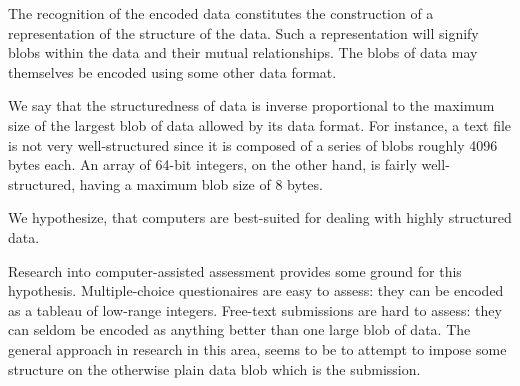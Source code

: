 The recognition of the encoded data constitutes the construction of a
representation of the structure of the data. Such a representation will signify
blobs within the data and their mutual relationships. The blobs of data may
themselves be encoded using some other data format.

We say that the structuredness of data is inverse proportional to the maximum
size of the largest blob of data allowed by its data format. For instance, a
text file is not very well-structured since it is composed of a series of blobs
roughly 4096 bytes each. An array of 64-bit integers, on the other hand, is
fairly well-structured, having a maximum blob size of 8 bytes.

We hypothesize, that computers are best-suited for dealing with highly
structured data.

Research into computer-assisted assessment provides some ground for this
hypothesis. Multiple-choice questionaires are easy to assess: they can be
encoded as a tableau of low-range integers. Free-text submissions are hard to
assess: they can seldom be encoded as anything better than one large blob of
data. The general approach in research in this area, seems to be to attempt to
impose some structure on the otherwise plain data blob which is the
submission\cite{valenti-et-al-2003}.












